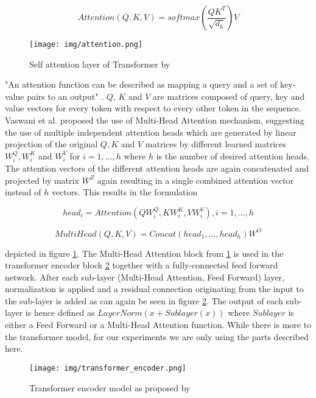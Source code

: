 \begin{equation}
	Attention(Q,K,V) = softmax(\frac{QK^T}{\sqrt{d_k}})V
\end{equation}

\begin{figure}[h]
	\centering
	\texttt{[image: img/attention.png]}
	\caption{Self attention layer of Transformer by \cite{attention_origin}}
	\label{fig:attention}
\end{figure}

"An attention function can be described as mapping a query and a set of key-value pairs to an output" \cite{attention_origin}. $Q$, $K$ and $V$ are matrices composed of query, key and value vectors for every token with respect to every other token in the sequence.
Vaswani et al. proposed the use of Multi-Head Attention mechanism, suggesting the use of multiple independent attention heads which are generated by linear projection of the original $Q, K$ and $V$ matrices by different learned matrices $W^Q_i, W^K_i$ and $W^V_i$ for $i = 1, ... ,h$ where $h$ is the number of desired attention heads. The attention vectors of the different attention heads are again concatenated and projected by matrix $W^Z$ again resulting in a single combined attention vector instead of $h$ vectors. This results in the formulation 

\begin{equation}
	head_i = Attention(QW^Q_i, KW^K_i, VW^V_i), i = 1, ..., h
\end{equation}

\begin{equation}
	MultiHead(Q,K,V) = Concat(head_1, ..., head_h)W^O
\end{equation}

depicted in figure \ref{fig:attention}. The Multi-Head Attention block from \ref{fig:attention} is
used in the transformer encoder block \ref{fig:transformer_encoder} together with a fully-connected feed forward network. After each sub-layer (Multi-Head Attention, Feed Forward) layer, normalization is applied and a residual connection originating from the input to the sub-layer is added as can again be seen in figure \ref{fig:transformer_encoder}. The output of each sub-layer is hence defined as $LayerNorm(x + Sublayer(x))$ where $Sublayer$ is either a Feed Forward or a Multi-Head Attention function. While there is more to the transformer model, for our experiments we are only using the parts described here.

\begin{figure}[h]
	\centering
	\texttt{[image: img/transformer\_encoder.png]}
	\caption{Transformer encoder model as proposed by \cite{attention_origin}}
	\label{fig:transformer_encoder}
\end{figure}

